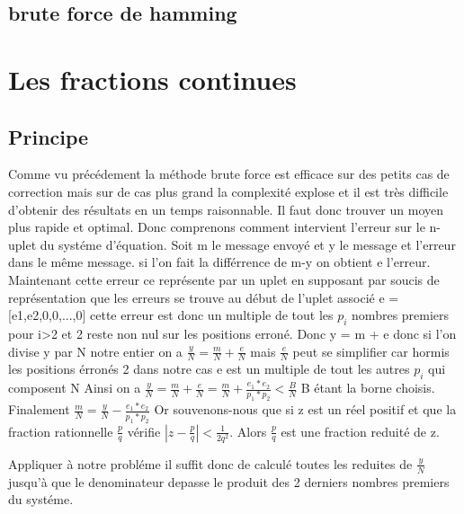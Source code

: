 \documentclass[a4paper, 11pt]{article}
\begin{document}
\newpage
\subsection{brute force de hamming}


\newpage
\section{Les fractions continues} 
\subsection{Principe}
    Comme vu précédement la méthode brute force est efficace sur des petits cas de correction mais sur de cas plus grand la complexité explose et il est très difficile d'obtenir des résultats en un temps raisonnable.\newline
Il faut donc trouver un moyen plus rapide et optimal. Donc comprenons comment intervient l'erreur sur le n-uplet du systéme d'équation.\newline
Soit m le message envoyé et y le message et l'erreur dans le même message. si l'on fait la différrence de m-y on obtient e l'erreur.
Maintenant cette erreur ce représente par un uplet en supposant par soucis de représentation que les erreurs se trouve au début de l'uplet associé
e = [e1,e2,0,0,...,0] cette erreur est donc un multiple de tout les $p_i$ nombres premiers pour i>2 et 2  reste non nul sur les positions erroné.\newline
Donc y = m + e donc si l'on divise y par N notre entier on a $\frac{y}{N}=\frac{m}{N}+\frac{e}{N}$\newline
mais $\frac{e}{N}$ peut se simplifier car hormis les positions érronés 2 dans notre cas e est un multiple de tout les autres $p_i$ qui composent N\newline
Ainsi on a  $\frac{y}{N}=\frac{m}{N}+\frac{e}{N}=\frac{m}{N}+ \frac{e_1 * e_2}{p_1 * p_2 } <\frac{B}{N} $    B étant la borne choisis.\newline
Finalement $\frac{m}{N}=\frac{y}{N} - \frac{e_1 * e_2}{p_1 * p_2 } $ \newline
\newline
Or souvenons-nous que si z est un réel positif et que la fraction rationnelle $\frac{p}{q}$
vérifie $ \left| z - \frac{p}{q} \right| < \frac{1}{2q^2} $. 
Alors $\frac{p}{q}$ est une fraction reduité de z.\newline
\newline

Appliquer à notre probléme il suffit donc de calculé toutes les reduites de $\frac{y}{N}$ jusqu'à que le denominateur depasse le produit des 2 derniers nombres premiers du systéme.\newline
\end{document}
